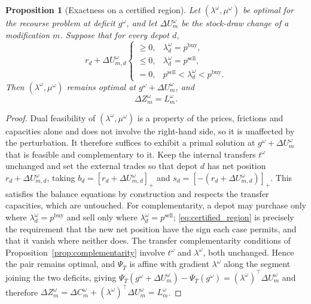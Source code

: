\documentclass[authoryear,final,3p,times]{elsarticle}
\newtheorem{proposition}{Proposition}
\theoremstyle{definition}
\theoremstyle{plain}
\begin{document}
\begin{proposition}[Exactness on a certified region]
\label{prop:certified_region}
Let $(\lambda^\omega,\mu^\omega)$ be optimal for the recourse problem at
deficit $g^\omega$, and let $\Delta U_m^\omega$ be the stock-draw change of a
modification $m$. Suppose that for every depot $d$,
\begin{equation}
 r_d+\Delta U_{m,d}^\omega
 \begin{cases}
 \ge0, & \lambda_d^\omega=p^{\mathrm{buy}},\\
 \le0, & \lambda_d^\omega=p^{\mathrm{sell}},\\
 =0, & p^{\mathrm{sell}}<\lambda_d^\omega<p^{\mathrm{buy}}.
 \end{cases}
 \label{eq:certified_region}
\end{equation}
Then $(\lambda^\omega,\mu^\omega)$ remains optimal at
$g^\omega+\Delta U_m^\omega$, and
\begin{equation*}
 \Delta Z_m^\omega=L_m^\omega .
\end{equation*}
\end{proposition}

\begin{proof}
Dual feasibility of $(\lambda^\omega,\mu^\omega)$ is a property of the
prices, frictions and capacities alone and does not involve the right-hand
side, so it is unaffected by the perturbation. It therefore suffices to
exhibit a primal solution at $g^\omega+\Delta U_m^\omega$ that is feasible
and complementary to it. Keep the internal transfers $t^\omega$ unchanged and
set the external trades so that depot $d$ has net position
$r_d+\Delta U_{m,d}^\omega$, taking $b_d=[r_d+\Delta U_{m,d}^\omega]_+$ and
$s_d=[-(r_d+\Delta U_{m,d}^\omega)]_+$. This satisfies the balance equations
by construction and respects the transfer capacities, which are untouched.
For complementarity, a depot may purchase only where
$\lambda_d^\omega=p^{\mathrm{buy}}$ and sell only where
$\lambda_d^\omega=p^{\mathrm{sell}}$; \eqref{eq:certified_region} is
precisely the requirement that the new net position have the sign each case
permits, and that it vanish where neither does. The transfer complementarity
conditions of Proposition~\ref{prop:complementarity} involve $t^\omega$ and
$\lambda^\omega$, both unchanged. Hence the pair remains optimal, and
$\Psi_{\overline T}$ is affine with gradient $\lambda^\omega$ along the
segment joining the two deficits, giving
$\Psi_{\overline T}(g^\omega+\Delta U_m^\omega)-\Psi_{\overline T}(g^\omega)
=(\lambda^\omega)^\top\Delta U_m^\omega$ and therefore
$\Delta Z_m^\omega=\Delta C_m^\omega+(\lambda^\omega)^\top\Delta U_m^\omega
=L_m^\omega$.
\end{proof}
\end{document}
